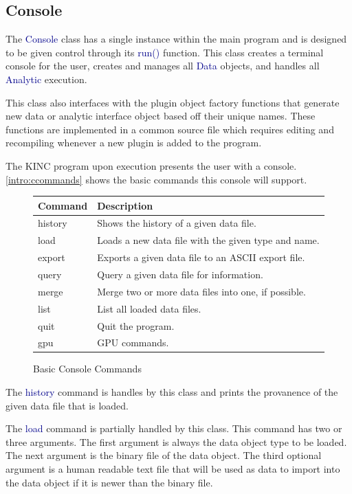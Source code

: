 \documentclass[10pt]{article}
\providecommand{\h}[1]{\textcolor{darkblue}{#1}}
\begin{document}
\subsection{Console}

The \h{Console} class has a single instance within the main program and is 
designed to be given control through its \h{run()} 
function. This class creates a terminal console for the user, creates and 
manages all \h{Data} objects, and handles all \h{Analytic} execution.

This class also interfaces with the plugin object factory functions that 
generate new data or analytic interface object based off their unique names. 
These functions are implemented in a common source file which requires editing 
and recompiling whenever a new plugin is added to the program.

The KINC program upon execution presents the user with a console. 
\autoref{intro:ccommands} shows the basic commands this console will support.

\begin{figure}[H]
\begin{mdframed}[style=vtable]
\begin{tabularx}{\textwidth}{|l|X|}
\hline
\textbf{Command} & \textbf{Description} \\
\hline
history & Shows the history of a given data file. \\
\hline
load & Loads a new data file with the given type and name. \\
\hline
export & Exports a given data file to an ASCII export file. \\
\hline
query & Query a given data file for information. \\
\hline
merge & Merge two or more data files into one, if possible. \\
\hline
list & List all loaded data files. \\
\hline
quit & Quit the program. \\
\hline
gpu & GPU commands. \\
\hline
\end{tabularx}
\end{mdframed}
\caption{Basic Console Commands}
\label{intro:ccommands}
\end{figure}

The \h{history} command is handles by this class and prints the provanence of 
the given data file that is loaded.

The \h{load} command is partially handled by this class. This command has two 
or three arguments. The first argument is always the data object type to be 
loaded. The next argument is the binary file of the data object. The third 
optional argument is a human readable text file that will be used as data to 
import into the data object if it is newer than the binary file.
\end{document}
